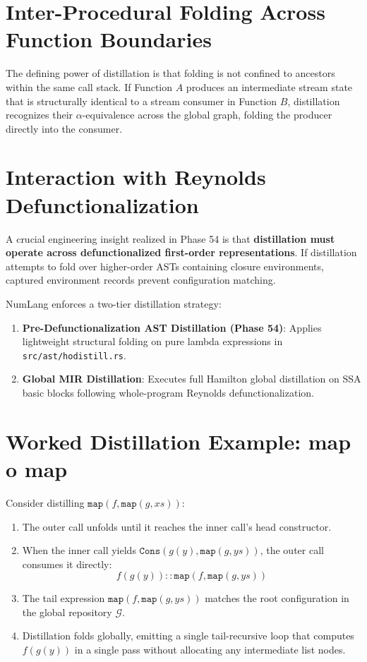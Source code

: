 \section{Inter-Procedural Folding Across Function Boundaries}
\label{sec:distillation:interprocedural}

The defining power of distillation is that folding is not confined to ancestors within the same call stack. If Function $A$ produces an intermediate stream state that is structurally identical to a stream consumer in Function $B$, distillation recognizes their $\alpha$-equivalence across the global graph, folding the producer directly into the consumer.

\section{Interaction with Reynolds Defunctionalization}
\label{sec:distillation:defunc_ordering}

A crucial engineering insight realized in Phase 54 is that \textbf{distillation must operate across defunctionalized first-order representations}. If distillation attempts to fold over higher-order ASTs containing closure environments, captured environment records prevent configuration matching. 

NumLang enforces a two-tier distillation strategy:
\begin{enumerate}
    \item \textbf{Pre-Defunctionalization AST Distillation (Phase 54)}: Applies lightweight structural folding on pure lambda expressions in \texttt{src/ast/hodistill.rs}.
    \item \textbf{Global MIR Distillation}: Executes full Hamilton global distillation on SSA basic blocks following whole-program Reynolds defunctionalization.
\end{enumerate}

\section{Worked Distillation Example: map o map}
\label{sec:distillation:map_map_walkthrough}

Consider distilling $\mathtt{map}(f, \mathtt{map}(g, xs))$:
\begin{enumerate}
    \item The outer call unfolds until it reaches the inner call's head constructor.
    \item When the inner call yields $\mathtt{Cons}(g(y), \mathtt{map}(g, ys))$, the outer call consumes it directly:
    \begin{equation}
    f(g(y)) :: \mathtt{map}(f, \mathtt{map}(g, ys))
    \end{equation}
    \item The tail expression $\mathtt{map}(f, \mathtt{map}(g, ys))$ matches the root configuration in the global repository $\mathcal{G}$.
    \item Distillation folds globally, emitting a single tail-recursive loop that computes $f(g(y))$ in a single pass without allocating any intermediate list nodes.
\end{enumerate}

